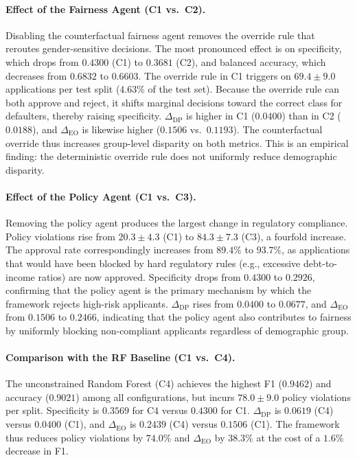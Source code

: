 \paragraph{Effect of the Fairness Agent (C1 vs.\ C2).}
Disabling the counterfactual fairness agent removes the override rule that
reroutes gender-sensitive decisions. The most pronounced effect is on
specificity, which drops from $0.4300$ (C1) to $0.3681$ (C2), and balanced
accuracy, which decreases from $0.6832$ to $0.6603$. The override rule in
C1 triggers on $69.4 \pm 9.0$ applications per test split ($4.63\%$ of the
test set). Because the override rule can both approve and reject, it shifts
marginal decisions toward the correct class for defaulters, thereby raising
specificity. $\Delta_{\text{DP}}$ is higher in C1 ($0.0400$) than in C2
($0.0188$), and $\Delta_{\text{EO}}$ is likewise higher ($0.1506$ vs.\
$0.1193$). The counterfactual override thus increases group-level disparity
on both metrics. This is an empirical finding: the deterministic override
rule does not uniformly reduce demographic disparity.

\paragraph{Effect of the Policy Agent (C1 vs.\ C3).}
Removing the policy agent produces the largest change in regulatory
compliance. Policy violations rise from $20.3 \pm 4.3$ (C1) to
$84.3 \pm 7.3$ (C3), a fourfold increase. The approval rate correspondingly
increases from $89.4\%$ to $93.7\%$, as applications that would have been
blocked by hard regulatory rules (e.g., excessive debt-to-income ratios)
are now approved. Specificity drops from $0.4300$ to $0.2926$, confirming
that the policy agent is the primary mechanism by which the framework
rejects high-risk applicants. $\Delta_{\text{DP}}$ rises from $0.0400$ to
$0.0677$, and $\Delta_{\text{EO}}$ from $0.1506$ to $0.2466$, indicating
that the policy agent also contributes to fairness by uniformly blocking
non-compliant applicants regardless of demographic group.

\paragraph{Comparison with the RF Baseline (C1 vs.\ C4).}
The unconstrained Random Forest (C4) achieves the highest F1 ($0.9462$) and
accuracy ($0.9021$) among all configurations, but incurs $78.0 \pm 9.0$
policy violations per split. Specificity is $0.3569$ for C4 versus $0.4300$
for C1. $\Delta_{\text{DP}}$ is $0.0619$ (C4) versus $0.0400$ (C1), and
$\Delta_{\text{EO}}$ is $0.2439$ (C4) versus $0.1506$ (C1). The framework
thus reduces policy violations by $74.0\%$ and $\Delta_{\text{EO}}$ by
$38.3\%$ at the cost of a $1.6\%$ decrease in F1.

